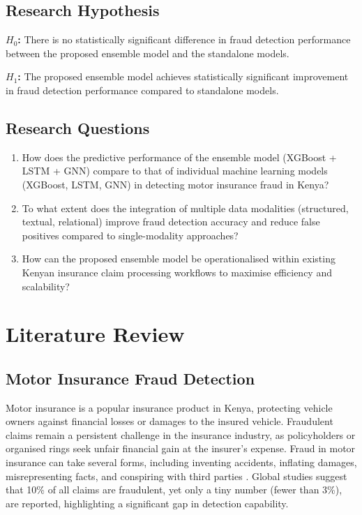 \documentclass[12pt,a4paper,oneside]{report}
\numberwithin{equation}{chapter}
\begin{document}
\section{Research Hypothesis}

\textbf{$H_0$:} There is no statistically significant difference in fraud detection performance
between the proposed ensemble model and the standalone models.

\textbf{$H_1$:} The proposed ensemble model achieves statistically significant improvement in
fraud detection performance compared to standalone models.

\section{Research Questions}
\begin{enumerate}
    \item How does the predictive performance of the ensemble model (XGBoost + LSTM + GNN) compare to that of individual machine learning models (XGBoost, LSTM, GNN) in detecting motor insurance fraud in Kenya?
    \item To what extent does the integration of multiple data modalities (structured, textual, relational) improve fraud detection accuracy and reduce false positives compared to single-modality approaches?
    \item How can the proposed ensemble model be operationalised within existing Kenyan insurance claim processing workflows to maximise efficiency and scalability?
\end{enumerate}

\chapter{Literature Review}

\section{Motor Insurance Fraud Detection}

Motor insurance is a popular insurance product in Kenya, protecting vehicle owners against
financial losses or damages to the insured vehicle. Fraudulent claims remain a persistent
challenge in the insurance industry, as policyholders or organised rings seek unfair financial
gain at the insurer's expense. Fraud in motor insurance can take several forms, including
inventing accidents, inflating damages, misrepresenting facts, and conspiring with third parties
\cite{njeru2022detection}. Global studies suggest that 10\% of all claims are fraudulent, yet
only a tiny number (fewer than 3\%),  \cite{mainafraud} are reported, highlighting a significant gap in detection
capability.
\end{document}
